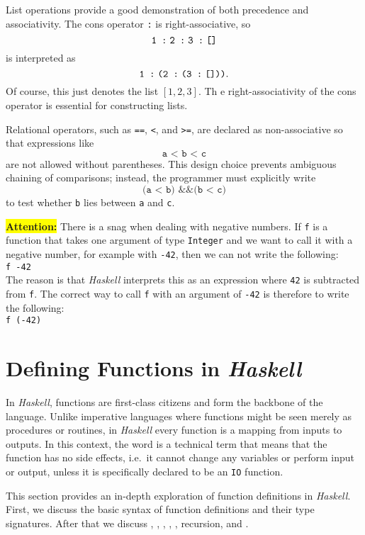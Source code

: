 List operations provide a good demonstration of both precedence and associativity. The cons operator \texttt{:}
is right-associative, so 
\[
\texttt{1 :\;2 :\;3 :\;[]}
\]
is interpreted as
\[
\texttt{1 :\;(2 :\;(3 :\;[]))}.
\]
Of course, this just denotes the list $[1,2,3]$.  Th e right-associativity of the cons operator is essential
for constructing lists.

Relational operators, such as \texttt{==}, \texttt{<}, and \texttt{>=}, are declared as non-associative so that
expressions like 
\[
\texttt{a < b < c}
\]
are not allowed without parentheses. This design choice prevents ambiguous chaining of comparisons; instead,
the programmer must explicitly write 
\[
\texttt{(a < b) \&\& (b < c)}
\]
to test whether \texttt{b} lies between \texttt{a} and \texttt{c}.

\noindent
\colorbox{yellow}{\textbf{Attention:}}  There is a snag when dealing with negative numbers.  If \texttt{f} is a function that
takes one argument of type \texttt{Integer} and we want to call it with a negative number, for example with
\texttt{-42}, then we can not write the following:
\\[0.2cm]
\hspace*{1.3cm}
\texttt{f -42}
\\[0.2cm]
The reason is that \textsl{Haskell} interprets this as an expression where \texttt{42} is subtracted from
\texttt{f}.  The correct way to call \texttt{f} with an argument of \texttt{-42} is therefore to write the following:
\\[0.2cm]
\hspace*{1.3cm}
\texttt{f (-42)}


\section{Defining Functions in \textsl{Haskell}}
In \textsl{Haskell}, functions are first-class citizens and form the backbone of the language. Unlike imperative
languages where functions might be seen merely as procedures or routines, in \textsl{Haskell} every function is a 
mapping from inputs to outputs.  In this context, the word  is a technical term that means that the
function has no side effects, i.e.~it cannot change any variables or perform input or output, unless it is
specifically declared to be an \texttt{IO} function.

This section provides an in-depth exploration of function definitions in
\textsl{Haskell}. First, we discuss the basic syntax of function definitions and their type signatures. After that we discuss
, , , , ,
recursion, and . 


